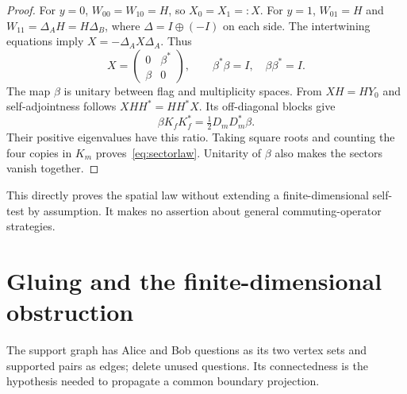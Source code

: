 \documentclass[11pt]{article}
\theoremstyle{definition}
\begin{document}
\begin{proof}
For $y=0$, $W_{00}=W_{10}=H$, so $X_0=X_1=:X$. For $y=1$, $W_{01}=H$ and $W_{11}=\Delta_AH=H\Delta_B$, where $\Delta=I\oplus(-I)$ on each side. The intertwining equations imply $X=-\Delta_AX\Delta_A$. Thus
\[
X=\begin{pmatrix}0&\beta^*\\\beta&0\end{pmatrix},\qquad
\beta^*\beta=I,\quad\beta\beta^*=I.
\]
The map $\beta$ is unitary between flag and multiplicity spaces. From $XH=HY_0$ and self-adjointness follows $XHH^*=HH^*X$. Its off-diagonal blocks give
\[
\beta K_fK_f^*=\tfrac12D_mD_m^*\beta.
\]
Their positive eigenvalues have this ratio. Taking square roots and counting the four copies in $K_m$ proves~\eqref{eq:sectorlaw}. Unitarity of $\beta$ also makes the sectors vanish together.
\end{proof}

This directly proves the spatial law without extending a finite-dimensional self-test by assumption. It makes no assertion about general commuting-operator strategies.

\section{Gluing and the finite-dimensional obstruction}\label{sec:gluing}
The support graph has Alice and Bob questions as its two vertex sets and supported pairs as edges; delete unused questions. Its connectedness is the hypothesis needed to propagate a common boundary projection.
\end{document}
